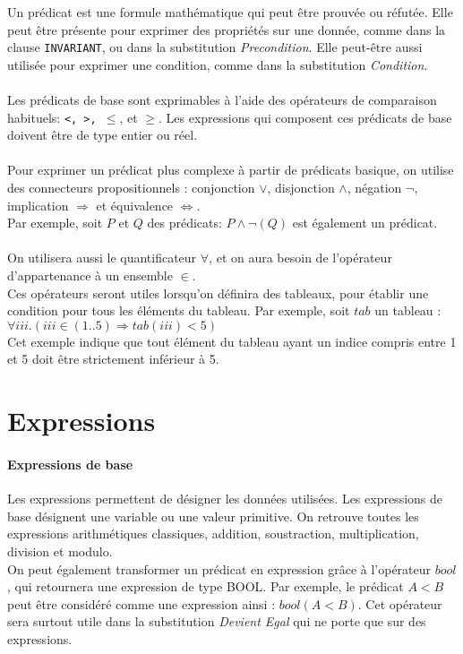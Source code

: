 Un prédicat est une formule mathématique qui peut être prouvée ou
réfutée. Elle peut être présente pour exprimer des propriétés sur une
donnée, comme dans la clause \texttt{INVARIANT}, ou dans la substitution
\emph{Precondition}. Elle peut-être aussi utilisée pour exprimer une
condition, comme dans la substitution \emph{Condition}.

\paragraph{}
Les prédicats de base sont exprimables à l'aide des opérateurs de
comparaison habituels: \texttt{<, >, $\leq$}, et \texttt{$\geq$}. Les
expressions qui composent ces prédicats de base doivent
être de type entier ou réel.

\paragraph{}
Pour exprimer un prédicat plus complexe à partir de prédicats basique,
on utilise des connecteurs propositionnels : conjonction \texttt{$\vee$},
disjonction \texttt{$\wedge$}, négation \texttt{$\neg$}, implication
\texttt{$\Rightarrow$} et équivalence \texttt{$\Leftrightarrow$}.\\
Par exemple, soit $P$ et $Q$ des prédicats: $P\wedge\neg(Q)$ est
également un prédicat.

\paragraph{}
On utilisera aussi le quantificateur $\forall$, et on aura besoin de
l'opérateur d'appartenance à un ensemble $\in$.\\  
Ces opérateurs seront utiles lorsqu'on
définira des tableaux, pour établir une condition pour tous les
éléments du tableau.
Par exemple, soit $tab$ un tableau : $\forall iii . (iii \in (1..5)
\Rightarrow tab(iii) < 5)$\\
Cet exemple indique que tout élément du tableau ayant un indice compris
entre 1 et 5 doit être strictement inférieur à 5. 



\section{Expressions}

\paragraph{Expressions de base}
Les expressions permettent de désigner les données utilisées. Les
expressions de base désignent une variable ou une valeur primitive.
On retrouve toutes les expressions arithmétiques classiques, addition,
soustraction, multiplication, division et modulo. \\
On peut également transformer un prédicat en expression grâce à
l'opérateur $bool$, qui retournera une expression de
type BOOL. Par exemple, le prédicat $A < B$ peut être considéré comme
une expression ainsi : $bool(A < B)$. Cet opérateur sera surtout utile dans la
substitution \emph{Devient Egal} qui ne porte que sur des expressions.

